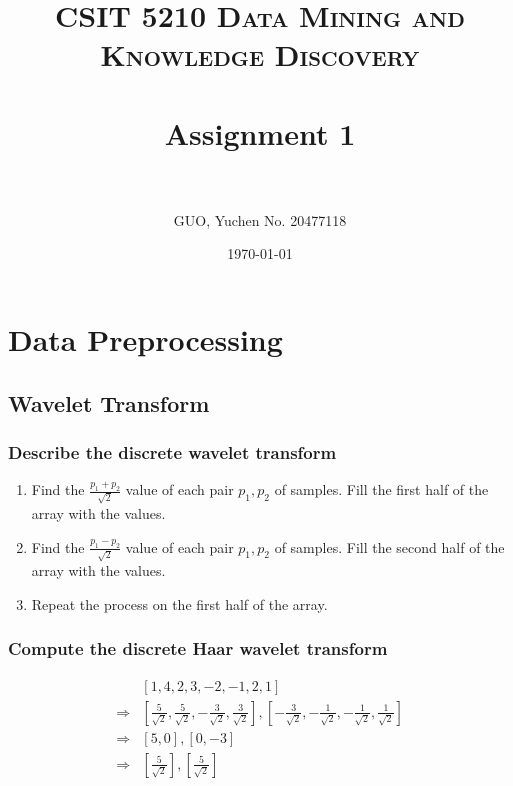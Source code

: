 \documentclass[paper=a4, fontsize=11pt]{scrartcl} %
\title{	
\normalfont \normalsize 
\textsc{CSIT 5210 Data Mining and Knowledge Discovery} \\ [25pt] %
\horrule{0.5pt} \\[0.4cm] %
\huge Assignment 1 \\ %
\horrule{2pt} \\[0.5cm] %
}
\author{GUO, Yuchen No. 20477118} %
\date{\normalsize\today} %
\numberwithin{equation}{section} %
\numberwithin{figure}{section} %
\numberwithin{table}{section} %
\begin{document}
\maketitle %


\section{Data Preprocessing}



\subsection{Wavelet Transform}


\subsubsection{Describe the discrete wavelet transform}

\begin{enumerate}
    \item Find the $\frac{p_1+p_2}{\sqrt{2}}$ value of each pair $p_1, p_2$ of samples. Fill the first half of the array with the values.
    \item Find the $\frac{p_1-p_2}{\sqrt{2}}$ value of each pair $p_1, p_2$ of samples. Fill the second half of the array with the values.
    \item Repeat the process on the first half of the array.
\end{enumerate}


\subsubsection{Compute the discrete Haar wavelet transform}

\begin{align*}
& [1, 4, 2, 3, -2, -1, 2, 1]\\ 
\Rightarrow & [\frac{5}{\sqrt{2}}, \frac{5}{\sqrt{2}}, -\frac{3}{\sqrt{2}}, \frac{3}{\sqrt{2}}], [-\frac{3}{\sqrt{2}}, -\frac{1}{\sqrt{2}}, -\frac{1}{\sqrt{2}}, \frac{1}{\sqrt{2}}]\\ 
\Rightarrow & [5, 0], [0, -3]\\ 
\Rightarrow & [\frac{5}{\sqrt{2}}], [\frac{5}{\sqrt{2}}]\\ 
\end{align*}
\end{document}

